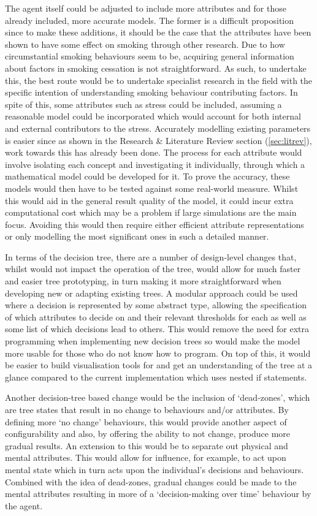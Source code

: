 \documentclass[]{report}
\begin{document}
The agent itself could be adjusted to include more attributes and for those already included, more accurate models. The former is a difficult proposition since to make these additions, it should be the case that the attributes have been shown to have some effect on smoking through other research. Due to how circumstantial smoking behaviours seem to be, acquiring general information about factors in smoking cessation is not straightforward. As such, to undertake this, the best route would be to undertake specialist research in the field with the specific intention of understanding smoking behaviour contributing factors. In spite of this, some attributes such as stress could be included, assuming a reasonable model could be incorporated which would account for both internal and external contributors to the stress. Accurately modelling existing parameters is easier since as shown in the Research \& Literature Review section (\ref{sec:litrev}), work towards this has already been done. The process for each attribute would involve isolating each concept and investigating it individually, through which a mathematical model could be developed for it. To prove the accuracy, these models would then have to be tested against some real-world measure. Whilst this would aid in the general result quality of the model, it could incur extra computational cost which may be a problem if large simulations are the main focus. Avoiding this would then require either efficient attribute representations or only modelling the most significant ones in such a detailed manner.

In terms of the decision tree, there are a number of design-level changes that, whilst would not impact the operation of the tree, would allow for much faster and easier tree prototyping, in turn making it more straightforward when developing new or adapting existing trees. A modular approach could be used where a decision is represented by some abstract type, allowing the specification of which attributes to decide on and their relevant thresholds for each as well as some list of which decisions lead to others. This would remove the need for extra programming when implementing new decision trees so would make the model more usable for those who do not know how to program. On top of this, it would be easier to build visualisation tools for and get an understanding of the tree at a glance compared to the current implementation which uses nested if statements.

Another decision-tree based change would be the inclusion of `dead-zones', which are tree states that result in no change to behaviours and/or attributes. By defining more `no change' behaviours, this would provide another aspect of configurability and also, by offering the ability to not change, produce more gradual results. An extension to this would be to separate out physical and mental attributes. This would allow for influence, for example, to act upon mental state which in turn acts upon the individual's decisions and behaviours. Combined with the idea of dead-zones, gradual changes could be made to the mental attributes resulting in more of a `decision-making over time' behaviour by the agent.
\end{document}
